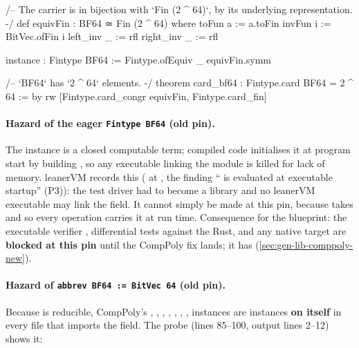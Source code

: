 \begin{leancode}
/-- The carrier is in bijection with `Fin (2 ^ 64)`, by its underlying representation. -/
def equivFin : BF64 ≃ Fin (2 ^ 64) where
  toFun a := a.toFin
  invFun i := BitVec.ofFin i
  left_inv _ := rfl
  right_inv _ := rfl

instance : Fintype BF64 := Fintype.ofEquiv _ equivFin.symm

/-- `BF64` has `2 ^ 64` elements. -/
theorem card_bf64 : Fintype.card BF64 = 2 ^ 64 := by
  rw [Fintype.card_congr equivFin, Fintype.card_fin]
\end{leancode}


\paragraph{Hazard of the eager \texorpdfstring{\texttt{Fintype BF64}}{Fintype BF64} (old pin).}
The instance is a closed computable term; compiled code initialises it at program start by
building , so any executable linking the module is killed for lack of
memory. leanerVM records this (\allowbreak{}\allowbreak{} at ,
the finding \enquote{ is evaluated at executable startup} (P3)):
the test driver had to become a library and no leanerVM executable may link the field. It cannot
simply be made  at this pin, because  takes
\lean{[Fintype F]} and so every  operation carries it at run time. Consequence for the
blueprint: the executable verifier , differential tests against the Rust, and any
native target are \textbf{blocked at this pin} until the CompPoly fix lands; it has
(\cref{sec:gen-lib-comppoly-new}).

\paragraph{Hazard of \texorpdfstring{\texttt{abbrev BF64 := BitVec 64}}{abbrev BF64} (old pin).}
Because  is reducible, CompPoly's , , , ,
, , ,  instances are instances \textbf{on
 itself} in every file that imports the field. The probe 
(lines 85--100, output lines 2--12) shows it:


